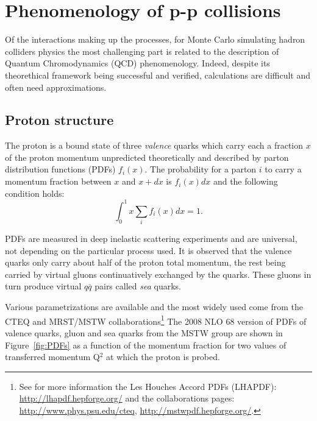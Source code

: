 \section{Phenomenology of p-p collisions}\label{sec:MCphenomenology}

Of the interactions making up the processes, for Monte Carlo simulating
hadron colliders physics the most challenging part is related to the
description of Quantum Chromodynamics (QCD) phenomenology. Indeed,
despite its theorethical framework being successful and verified, calculations
are difficult and often need approximations.

\subsection{Proton structure}

The proton is a bound state of three {\it valence} quarks which carry
each a fraction $x$ of the proton momentum unpredicted theoretically and described
by parton distribution functions (PDFs) $f_i(x)$. The probability for a parton $i$
to carry a momentum fraction between $x$ and $x+dx$ is $f_i(x)dx$ and the following
condition holds:
\begin{equation}
\int_0^1 x \sum  \limits_i f_i(x) dx = 1.
\end{equation}

PDFs are measured in deep inelastic scattering experiments and 
are universal, not depending on the particular process used.
It is observed that the valence quarks only carry about half of the proton total
momentum, the rest being carried by virtual gluons continuatively exchanged 
by the quarks. These gluons in turn produce virtual $q\bar{q}$ pairs called
{\it sea} quarks.

Various parametrizations are available and the most widely used come from the
CTEQ and MRST/MSTW collaborations\footnote{See for more information
the Les Houches Accord PDFs (LHAPDF): \url{http://lhapdf.hepforge.org/}
and the collaborations pages: \url{http://www.phys.psu.edu/cteq}, 
\url{http://mstwpdf.hepforge.org/}.}
The 2008 NLO 68 version of PDFs of valence quarks, gluon and sea quarks 
from the MSTW group are shown in Figure~\ref{fig:PDFs} as a function of the 
momentum fraction for two values of transferred momentum Q$^2$
at which the proton is probed.

